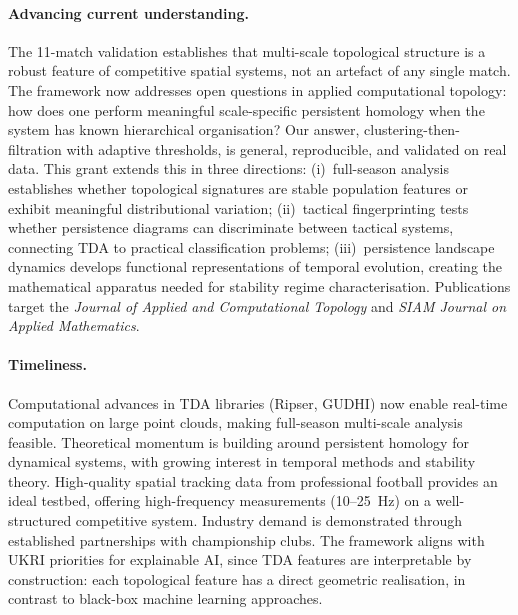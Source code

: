 \paragraph{Advancing current understanding.}
The 11-match validation establishes that multi-scale topological structure is a robust feature of competitive spatial systems, not an artefact of any single match. The framework now addresses open questions in applied computational topology: how does one perform meaningful scale-specific persistent homology when the system has known hierarchical organisation? Our answer, clustering-then-filtration with adaptive thresholds, is general, reproducible, and validated on real data. This grant extends this in three directions: (i)~full-season analysis establishes whether topological signatures are stable population features or exhibit meaningful distributional variation; (ii)~tactical fingerprinting tests whether persistence diagrams can discriminate between tactical systems, connecting TDA to practical classification problems; (iii)~persistence landscape dynamics develops functional representations of temporal evolution, creating the mathematical apparatus needed for stability regime characterisation. Publications target the \emph{Journal of Applied and Computational Topology} and \emph{SIAM Journal on Applied Mathematics}.

\paragraph{Timeliness.}
Computational advances in TDA libraries (Ripser, GUDHI) now enable real-time computation on large point clouds, making full-season multi-scale analysis feasible. Theoretical momentum is building around persistent homology for dynamical systems, with growing interest in temporal methods and stability theory. High-quality spatial tracking data from professional football provides an ideal testbed, offering high-frequency measurements (10--25~Hz) on a well-structured competitive system. Industry demand is demonstrated through established partnerships with championship clubs. The framework aligns with UKRI priorities for explainable AI, since TDA features are interpretable by construction: each topological feature has a direct geometric realisation, in contrast to black-box machine learning approaches.

